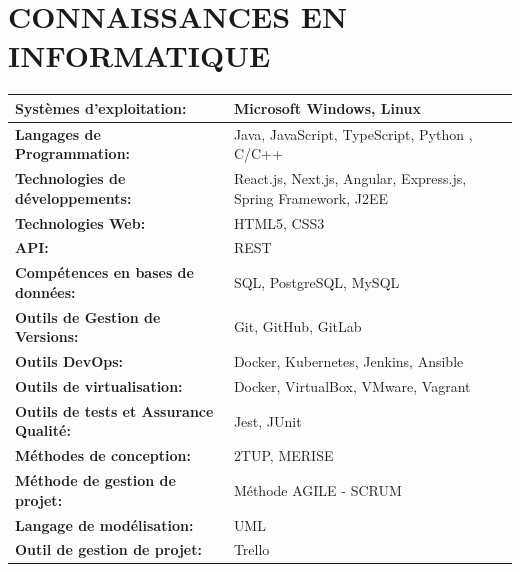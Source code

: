 \documentclass[12pt]{report}
\begin{document}
			\section*{CONNAISSANCES EN INFORMATIQUE}
			\begin{center}
				\begin{minipage}{\textwidth}
					\begin{center}
						\begin{tabularx}{\textwidth}{|X|X|}
							\hline
							\textbf{Systèmes d'exploitation:} & Microsoft Windows, Linux\\
							\hline
							\textbf{Langages de Programmation:} & Java, JavaScript, TypeScript, Python , C/C++\\
							\hline
							\textbf{Technologies de développements:} &  React.js, Next.js, Angular, Express.js, Spring Framework, J2EE\\
							\hline
							\textbf{Technologies Web:} & HTML5, CSS3\\
							\hline
							\textbf{API:} & REST\\
							\hline
							\textbf{Compétences en bases de données:} &  SQL, PostgreSQL, MySQL\\
							\hline
							\textbf{Outils de Gestion de Versions:} & Git, GitHub, GitLab\\
							\hline
							\textbf{Outils DevOps:} &  Docker, Kubernetes, Jenkins, Ansible\\
							\hline
							\textbf{Outils de virtualisation:} & Docker, VirtualBox, VMware, Vagrant\\
							\hline
							\textbf{Outils de tests et Assurance Qualité:} & Jest, JUnit\\
							\hline
							\textbf{Méthodes de conception:} &2TUP, MERISE\\
							\hline
							\textbf{Méthode de gestion de projet:} &Méthode AGILE - SCRUM\\
							\hline
							\textbf{Langage de modélisation:} & UML\\
							\hline
							\textbf{Outil de gestion de projet:} & Trello\\
							\hline
						\end{tabularx}
					\end{center}
	   			\end{minipage}		
			\end{center}
\end{document}
